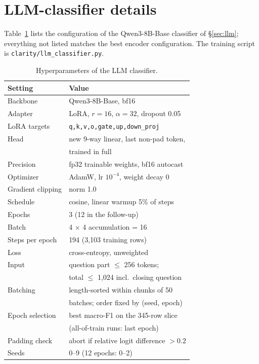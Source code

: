 \section{LLM-classifier details}\label{sec:app-llm}

Table~\ref{tab:app-llm-hparams} lists the configuration of the Qwen3-8B-Base classifier of \S\ref{sec:llm}; everything not listed matches the best encoder configuration.
The training script is \texttt{clarity/llm\_classifier.py}.

\begin{table}[t]
\centering
\small
\begin{tabular}{@{}ll@{}}
\toprule
Setting & Value \\
\midrule
Backbone & Qwen3-8B-Base, bf16 \\
Adapter & LoRA, $r=16$, $\alpha=32$, dropout 0.05 \\
LoRA targets & \texttt{q,k,v,o,gate,up,down\_proj} \\
Head & new 9-way linear, last non-pad token, \\
     & trained in full \\
Precision & fp32 trainable weights, bf16 autocast \\
Optimizer & AdamW, lr $10^{-4}$, weight decay 0 \\
Gradient clipping & norm 1.0 \\
Schedule & cosine, linear warmup 5\% of steps \\
Epochs & 3 (12 in the follow-up) \\
Batch & 4 $\times$ 4 accumulation = 16 \\
Steps per epoch & 194 (3,103 training rows) \\
Loss & cross-entropy, unweighted \\
Input & question part $\le$ 256 tokens; \\
      & total $\le$ 1,024 incl.\ closing question \\
Batching & length-sorted within chunks of 50 \\
         & batches; order fixed by (seed, epoch) \\
Epoch selection & best macro-F1 on the 345-row slice \\
                & (all-of-train runs: last epoch) \\
Padding check & abort if relative logit difference $>0.2$ \\
Seeds & 0--9 (12 epochs: 0--2) \\
\bottomrule
\end{tabular}
\caption{Hyperparameters of the LLM classifier.}
\label{tab:app-llm-hparams}
\end{table}

